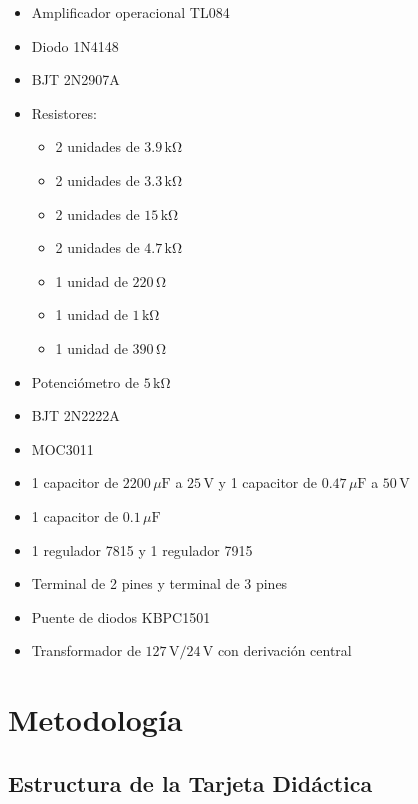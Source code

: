 \documentclass[12pt,a4paper]{article}
\begin{document}
\begin{itemize}
    \item Amplificador operacional TL084
    \item Diodo 1N4148
    \item BJT 2N2907A
    \item Resistores:
    \begin{itemize}
    \item 2 unidades de $3{.}9\,\mathrm{k\Omega}$
    \item 2 unidades de $3{.}3\,\mathrm{k\Omega}$
    \item 2 unidades de $15\,\mathrm{k\Omega}$
    \item 2 unidades de $4{.}7\,\mathrm{k\Omega}$
    \item 1 unidad de $220\,\mathrm{\Omega}$
    \item 1 unidad de $1\,\mathrm{k\Omega}$
    \item 1 unidad de $390\,\mathrm{\Omega}$
\end{itemize}
    \item Potenciómetro de $5\,\mathrm{k\Omega}$
    \item BJT 2N2222A
    \item MOC3011
    \item 1 capacitor de $2200\,\mu\mathrm{F}$ a $25\,\mathrm{V}$ y 1 capacitor de $0{.}47\,\mu\mathrm{F}$ a $50\,\mathrm{V}$
    \item 1 capacitor de $0{.}1\,\mu\mathrm{F}$
\item 1 regulador 7815 y 1 regulador 7915
\item Terminal de 2 pines y terminal de 3 pines
\item Puente de diodos KBPC1501
\item Transformador de $127\,\mathrm{V}/24\,\mathrm{V}$ con derivación central
\end{itemize}




\section{Metodología}
 
\subsection{Estructura de la Tarjeta Didáctica}
 
\end{document}
